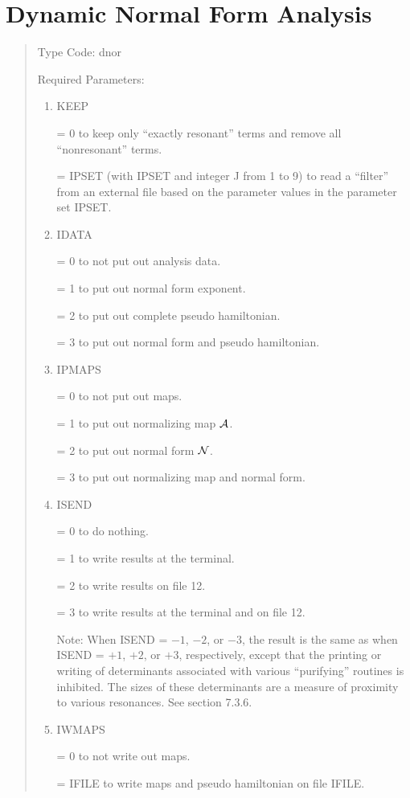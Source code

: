 \section{Dynamic Normal Form Analysis}
\begin{quotation}
\noindent     Type Code:  dnor
\vspace{5mm}

\noindent Required Parameters:
\begin{enumerate}
      \item  KEEP

             = 0 to keep only ``exactly resonant'' terms and remove all
               ``nonresonant'' \hspace*{1em}terms.

             = IPSET (with IPSET and integer J from 1 to 9) to read a
               ``filter'' from an \hspace*{1em}external file based on the parameter values
               in the parameter set IPSET.

      \item  IDATA

             = 0 to not put out analysis data.

             = 1 to put out normal form exponent.

             = 2 to put out complete pseudo hamiltonian.

             = 3 to put out normal form and pseudo hamiltonian.

      \item  IPMAPS

             = 0 to not put out maps.

             = 1 to put out normalizing map ${\cal A}$.

             = 2 to put out normal form ${\cal N}$.

             = 3 to put out normalizing map and normal form.

      \item  ISEND

             = 0 to do nothing.

             = 1 to write results at the terminal.

             = 2 to write results on file 12.

             = 3 to write results at the terminal and on file 12.

             Note:  When ISEND = $-1$, $-2$, or $-3$, the result is the same as
             when ISEND = $+1$, $+2$, or $+3$, respectively, except that the
             printing or writing of determinants associated with various
             ``purifying'' routines is inhibited.  The sizes of these
             determinants are a measure of proximity to various resonances.  See section 7.3.6.


      \item  IWMAPS

             = 0 to not write out maps.

             = IFILE to write maps and pseudo hamiltonian on file IFILE.
\end{enumerate}
\end{quotation}
